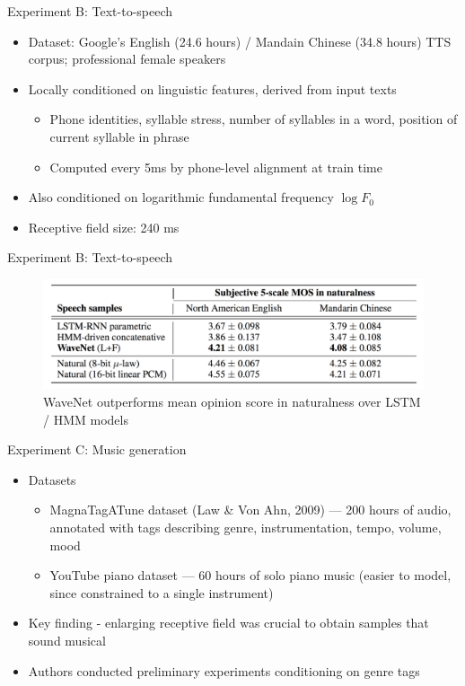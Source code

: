 \documentclass{beamer}
\begin{document}
  \begin{frame}{Experiment B: Text-to-speech}

    \begin{itemize}
      \item Dataset: Google's English (24.6 hours) / Mandain Chinese (34.8 hours) TTS corpus; professional female speakers
      \item Locally conditioned on linguistic features, derived from input texts
        \begin{itemize}
          \item Phone identities, syllable stress, number of syllables in a word, position of current syllable in phrase
          \item Computed every 5ms by phone-level alignment at train time
        \end{itemize}
      \item Also conditioned on logarithmic fundamental frequency $\log F_0$
      \item Receptive field size: 240 ms
    \end{itemize}
  \end{frame}

  \begin{frame}{Experiment B: Text-to-speech}
    \begin{figure}
      \includegraphics[width=1.0\textwidth]{img/exp_b.png}
      \caption{WaveNet outperforms mean opinion score in naturalness over LSTM / HMM models}
    \end{figure}
  \end{frame}

  \begin{frame}{Experiment C: Music generation}
    \begin{itemize}
        \item Datasets
          \begin{itemize}
            \item MagnaTagATune dataset (Law \& Von Ahn, 2009) --- 200 hours of audio, annotated with tags describing genre, instrumentation, tempo, volume, mood
            \item YouTube piano dataset --- 60 hours of solo piano music (easier to model, since constrained to a single instrument)
          \end{itemize}
        \item Key finding - enlarging receptive field was crucial to obtain samples that sound musical
        \item Authors conducted preliminary experiments conditioning on genre tags
    \end{itemize}
  \end{frame}
\end{document}
